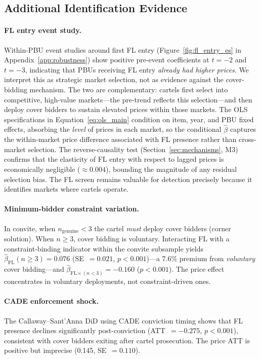 
\subsection{Additional Identification Evidence}
\label{sec:additional_id}

\paragraph{FL entry event study.}Within-PBU event studies around first FL entry
(Figure~\ref{fig:fl_entry_es} in Appendix~\ref{app:robustness}) show
positive pre-event coefficients at $t = -2$ and $t = -3$, indicating
that PBUs receiving FL entry \emph{already had higher prices}. We
interpret this as strategic market selection, not as evidence against
the cover-bidding mechanism. The two are complementary: cartels first
select into competitive, high-value markets---the pre-trend reflects
this selection---and then deploy cover bidders to sustain elevated
prices within those markets. The OLS specifications in
Equation~\eqref{eq:ols_main} condition on item, year, and PBU fixed
effects, absorbing the \emph{level} of prices in each market, so the
conditional $\hat{\beta}$ captures the within-market price difference
associated with FL presence rather than cross-market selection. The
reverse-causality test (Section~\ref{sec:mechanisms}, M3) confirms
that the elasticity of FL entry with respect to lagged prices is
economically negligible ($\approx 0.004$), bounding the magnitude of
any residual selection bias. The FL screen remains valuable for
detection precisely because it identifies markets where cartels
operate.

\paragraph{Minimum-bidder constraint variation.}
In convite, when $n_{\text{genuine}} < 3$ the cartel \emph{must}
deploy cover bidders (corner solution). When $n \geq 3$, cover bidding
is voluntary. Interacting FL with a constraint-binding indicator within
the convite subsample yields $\hat{\beta}_{\text{FL}}(n \geq 3) =
0.076$ (SE~$= 0.021$, $p < 0.001$)---a 7.6\% premium from
\emph{voluntary} cover bidding---and $\hat{\beta}_{\text{FL} \times
(n<3)} = -0.160$ ($p < 0.001$). The price effect concentrates in
voluntary deployments, not constraint-driven ones.

\paragraph{CADE enforcement shock.}
The Callaway--Sant'Anna DiD using CADE conviction timing shows that FL
presence declines significantly post-conviction (ATT~$= -0.275$,
$p < 0.001$), consistent with cover bidders exiting after cartel
prosecution. The price ATT is positive but imprecise (0.145,
SE~$= 0.110$).
